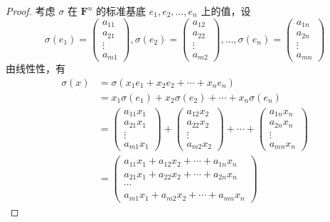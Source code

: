 \begin{proof}
    考虑 $\sigma$ 在 $\mathbf{F}^n$ 的标准基底 $e_1, e_2, \ldots, e_n$ 上的值，设
    \[
        \sigma(e_1) = \begin{pmatrix} a_{11} \\ a_{21} \\ \vdots \\ a_{m1} \end{pmatrix},
        \sigma(e_2) = \begin{pmatrix} a_{12} \\ a_{22} \\ \vdots \\ a_{m2} \end{pmatrix},
        \ldots,
        \sigma(e_n) = \begin{pmatrix} a_{1n} \\ a_{2n} \\ \vdots \\ a_{mn} \end{pmatrix}
    \]
    由线性性，有
    \begin{align*}
        \sigma(x) &= \sigma(x_1 e_1 + x_2 e_2 + \cdots + x_n e_n) \\
        &= x_1 \sigma(e_1) + x_2 \sigma(e_2) + \cdots + x_n \sigma(e_n) \\
        &= \begin{pmatrix} a_{11} x_1 \\ a_{21} x_1 \\ \vdots \\ a_{m1} x_1 \end{pmatrix} +
        \begin{pmatrix} a_{12} x_2 \\ a_{22} x_2 \\ \vdots \\ a_{m2} x_2 \end{pmatrix} +
        \cdots +
        \begin{pmatrix} a_{1n} x_n \\ a_{2n} x_n \\ \vdots \\ a_{mn} x_n \end{pmatrix}\\
        &= \begin{pmatrix}
            a_{11} x_1 + a_{12} x_2 + \cdots + a_{1n} x_n \\
            a_{21} x_1 + a_{22} x_2 + \cdots + a_{2n} x_n \\
            \cdots\\
            a_{m1} x_1 + a_{m2} x_2 + \cdots + a_{mn} x_n
        \end{pmatrix}
    \end{align*}
\end{proof}

